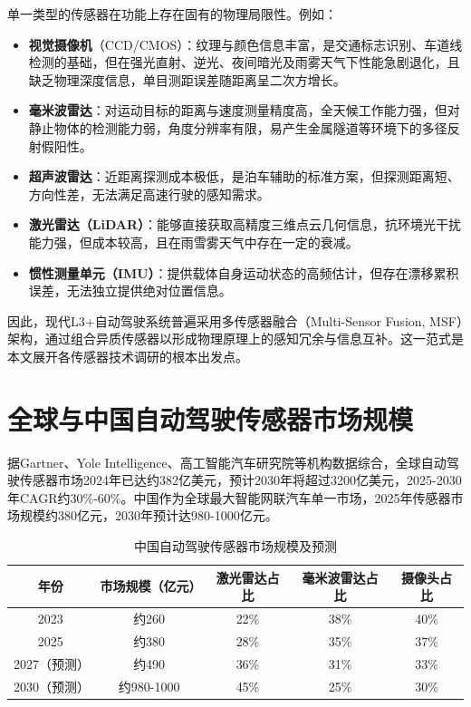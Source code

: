 \documentclass[12pt,a4paper,openany,UTF8]{ctexbook}
\begin{document}
单一类型的传感器在功能上存在固有的物理局限性。例如：
\begin{itemize}
    \item \textbf{视觉摄像机}（CCD/CMOS）：纹理与颜色信息丰富，是交通标志识别、车道线检测的基础，但在强光直射、逆光、夜间暗光及雨雾天气下性能急剧退化，且缺乏物理深度信息，单目测距误差随距离呈二次方增长。
    \item \textbf{毫米波雷达}：对运动目标的距离与速度测量精度高，全天候工作能力强，但对静止物体的检测能力弱，角度分辨率有限，易产生金属隧道等环境下的多径反射假阳性。
    \item \textbf{超声波雷达}：近距离探测成本极低，是泊车辅助的标准方案，但探测距离短、方向性差，无法满足高速行驶的感知需求。
    \item \textbf{激光雷达（LiDAR）}：能够直接获取高精度三维点云几何信息，抗环境光干扰能力强，但成本较高，且在雨雪雾天气中存在一定的衰减。
    \item \textbf{惯性测量单元（IMU）}：提供载体自身运动状态的高频估计，但存在漂移累积误差，无法独立提供绝对位置信息。
\end{itemize}

因此，现代L3+自动驾驶系统普遍采用多传感器融合（Multi-Sensor Fusion, MSF）架构，通过组合异质传感器以形成物理原理上的感知冗余与信息互补。这一范式是本文展开各传感器技术调研的根本出发点。

\section{全球与中国自动驾驶传感器市场规模}

据Gartner、Yole Intelligence、高工智能汽车研究院等机构数据综合，全球自动驾驶传感器市场2024年已达约382亿美元，预计2030年将超过3200亿美元，2025-2030年CAGR约30\%-60\%。中国作为全球最大智能网联汽车单一市场，2025年传感器市场规模约380亿元，2030年预计达980-1000亿元。

\begin{table}[htbp]
\centering
\caption{中国自动驾驶传感器市场规模及预测}
\label{tab:market_size}
\begin{tabular}{ccccc}
\toprule
\textbf{年份} & \textbf{市场规模（亿元）} & \textbf{激光雷达占比} & \textbf{毫米波雷达占比} & \textbf{摄像头占比} \\
\midrule
2023 & 约260 & 22\% & 38\% & 40\% \\
2025 & 约380 & 28\% & 35\% & 37\% \\
2027（预测） & 约490 & 36\% & 31\% & 33\% \\
2030（预测） & 约980-1000 & 45\% & 25\% & 30\% \\
\bottomrule
\end{tabular}
\end{table}
\end{document}
